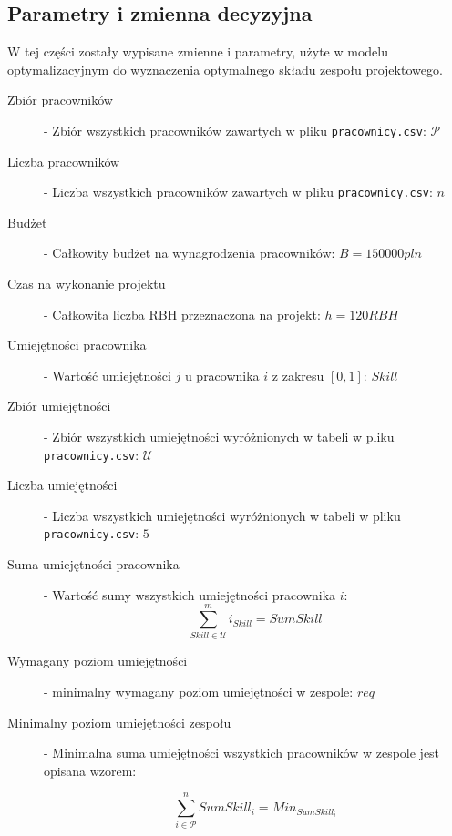     \subsection{Parametry i zmienna decyzyjna}
    \par W tej części zostały wypisane zmienne i parametry, użyte w modelu optymalizacyjnym do wyznaczenia optymalnego składu zespołu projektowego.
    \begin{description}

        \item[Zbiór pracowników] - Zbiór wszystkich pracowników zawartych w pliku \verb|pracownicy.csv|: $\mathcal{P}$

        \item[Liczba pracowników] - Liczba wszystkich pracowników zawartych w pliku \verb|pracownicy.csv|: $n$
    
        \item[Budżet] - Całkowity budżet na wynagrodzenia pracowników: $B = 150 000pln$
        
        \item[Czas na wykonanie projektu] - Całkowita liczba RBH przeznaczona na projekt: $h = 120 RBH$

        \item[Umiejętności pracownika] - Wartość umiejętności $j$ u pracownika $i$ z zakresu $[0, 1]$: $Skill$

        \item[Zbiór umiejętności] - Zbiór wszystkich umiejętności wyróżnionych w tabeli w pliku \verb|pracownicy.csv|: $\mathcal{U}$

        \item[Liczba umiejętności] - Liczba wszystkich umiejętności wyróżnionych w tabeli w pliku \verb|pracownicy.csv|: $5$
        
        \item[Suma umiejętności pracownika] - Wartość sumy wszystkich umiejętności pracownika $i$: 
            \[
                \sum_{Skill \in \mathcal{U}}^{m} i_{Skill} = SumSkill
            \]
        
        \item[Wymagany poziom umiejętności] - minimalny wymagany poziom umiejętności w zespole: $req$
        
        \item[Minimalny poziom umiejętności zespołu] - Minimalna suma umiejętności wszystkich pracowników w zespole jest opisana wzorem:
        
        \[
        \sum_{i \in \mathcal{P}}^{n} SumSkill_{i} = Min_{SumSkill_{i}}
        \]
        

\end{description}
